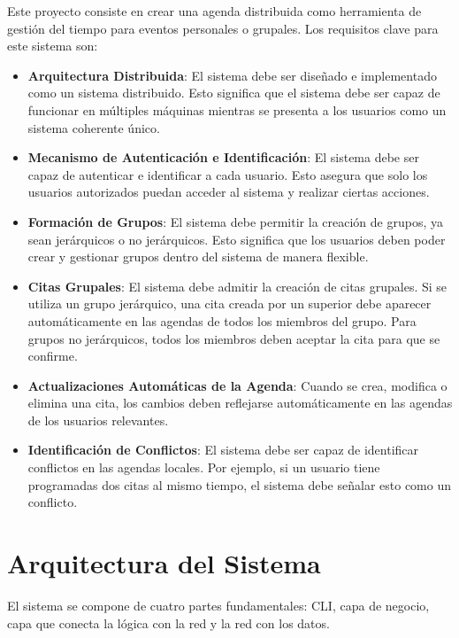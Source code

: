 \documentclass[10pt]{article} %
\begin{document}
	Este proyecto consiste en crear una agenda distribuida como herramienta de gestión del tiempo para eventos personales o grupales. Los requisitos clave para este sistema son:
	
	\begin{itemize}
		\item \textbf{Arquitectura Distribuida}: El sistema debe ser diseñado e implementado como un sistema distribuido. Esto significa que el sistema debe ser capaz de funcionar en múltiples máquinas mientras se presenta a los usuarios como un sistema coherente único.
		
		\item \textbf{Mecanismo de Autenticación e Identificación}: El sistema debe ser capaz de autenticar e identificar a cada usuario. Esto asegura que solo los usuarios autorizados puedan acceder al sistema y realizar ciertas acciones.
		
		\item \textbf{Formación de Grupos}: El sistema debe permitir la creación de grupos, ya sean jerárquicos o no jerárquicos. Esto significa que los usuarios deben poder crear y gestionar grupos dentro del sistema de manera flexible.
		
		\item \textbf{Citas Grupales}: El sistema debe admitir la creación de citas grupales. Si se utiliza un grupo jerárquico, una cita creada por un superior debe aparecer automáticamente en las agendas de todos los miembros del grupo. Para grupos no jerárquicos, todos los miembros deben aceptar la cita para que se confirme.
		
		\item \textbf{Actualizaciones Automáticas de la Agenda}: Cuando se crea, modifica o elimina una cita, los cambios deben reflejarse automáticamente en las agendas de los usuarios relevantes.
		
		\item \textbf{Identificación de Conflictos}: El sistema debe ser capaz de identificar conflictos en las agendas locales. Por ejemplo, si un usuario tiene programadas dos citas al mismo tiempo, el sistema debe señalar esto como un conflicto.
		
	\end{itemize}
	
	\section{Arquitectura del Sistema}
	
	El sistema se compone de cuatro partes fundamentales: CLI, capa de negocio, capa que conecta la l\'ogica con la red y la red con los datos.
	
\end{document}
